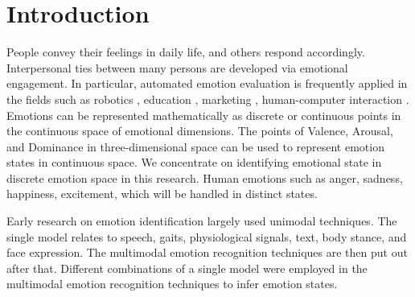 \documentclass[conference]{IEEEtran}
\begin{document}
\section{Introduction}
People convey their feelings in daily life, and others respond accordingly. Interpersonal ties between many persons are developed via emotional engagement. In particular, automated emotion evaluation is frequently applied in the fields such as robotics \cite{ref-1}, education \cite{ref-3}, marketing \cite{ref-2}, human-computer interaction \cite{ref-37}. Emotions can be represented mathematically as discrete or continuous points in the continuous space of emotional dimensions. The points of Valence, Arousal, and Dominance in three-dimensional space can be used to represent emotion states in continuous space. We concentrate on identifying emotional state in discrete emotion space in this research. Human emotions such as anger, sadness, happiness, excitement, which will be handled in distinct states.

Early research on emotion identification largely used unimodal techniques. The single model relates to speech, gaits, physiological signals, text, body stance, and face expression. The multimodal emotion recognition techniques are then put out after that. Different combinations of a single model were employed in the multimodal emotion recognition techniques to infer emotion states.
\end{document}
